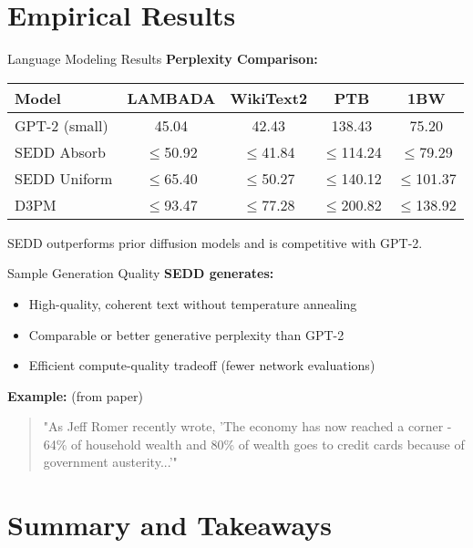 \documentclass{beamer}
\begin{document}
\section{Empirical Results}

\begin{frame}{Language Modeling Results}
  \textbf{Perplexity Comparison:}
  \begin{tabular}{lcccc}
    \toprule
    Model & LAMBADA & WikiText2 & PTB & 1BW \\
    \midrule
    GPT-2 (small) & 45.04 & 42.43 & 138.43 & 75.20 \\
    SEDD Absorb & $\leq$50.92 & $\leq$41.84 & $\leq$114.24 & $\leq$79.29 \\
    SEDD Uniform & $\leq$65.40 & $\leq$50.27 & $\leq$140.12 & $\leq$101.37 \\
    D3PM & $\leq$93.47 & $\leq$77.28 & $\leq$200.82 & $\leq$138.92 \\
    \bottomrule
  \end{tabular}
  \vspace{1em}
  SEDD outperforms prior diffusion models and is competitive with GPT-2.
\end{frame}

\begin{frame}{Sample Generation Quality}
  \textbf{SEDD generates:}
  \begin{itemize}
    \item High-quality, coherent text without temperature annealing
    \item Comparable or better generative perplexity than GPT-2
    \item Efficient compute-quality tradeoff (fewer network evaluations)
  \end{itemize}
  \vspace{1em}
  \textbf{Example:} (from paper)
  \begin{quote}
    "As Jeff Romer recently wrote, 'The economy has now reached a corner - 64\% of household wealth and 80\% of wealth goes to credit cards because of government austerity...'"
  \end{quote}
\end{frame}

\section{Summary and Takeaways}
\end{document}
